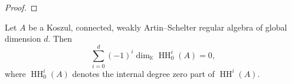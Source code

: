 \documentclass{amsart}
\DeclareMathOperator{\Hom}{Hom}
\def\HH{\operatorname{HH}}
\begin{document}
\begin{proof}



\end{proof}

\begin{corollary}
Let \( A \) be a Koszul, connected, weakly Artin–Schelter regular algebra of global dimension \( d \). Then
\[
\sum_{i=0}^d (-1)^i \dim_{\mathbb{K}} \HH^i_0(A) = 0,
\]
where \( \HH^i_0(A) \) denotes the internal degree zero part of \( \HH^i(A) \).
\end{corollary}



\end{document}
